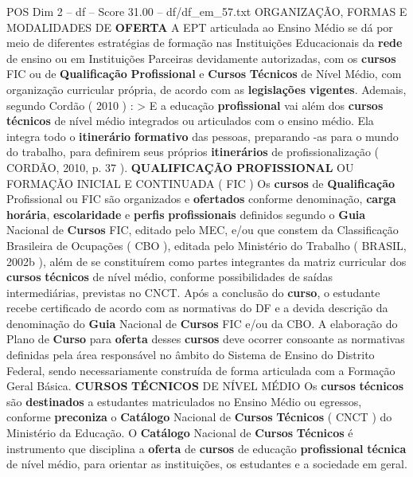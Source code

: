 \begin{textsample}{POS Dim 2 – df – Score 31.00 – df/df\_em\_57.txt}  \label{ex:f2_pos_121}
ORGANIZAÇÃO, FORMAS E MODALIDADES DE \textbf{OFERTA} A EPT articulada ao Ensino Médio se dá por meio de diferentes estratégias de formação nas Instituições Educacionais da \textbf{rede} de ensino ou em Instituições Parceiras devidamente autorizadas, com os \textbf{cursos} FIC ou de \textbf{Qualificação} \textbf{Profissional} e \textbf{Cursos} \textbf{Técnicos} de Nível Médio, com organização curricular própria, de acordo com as \textbf{legislações} \textbf{vigentes}.
Ademais, segundo Cordão ( 2010 ) : > E a educação \textbf{profissional} vai além dos \textbf{cursos} \textbf{técnicos} de nível médio integrados ou articulados com o ensino médio.
Ela integra todo o \textbf{itinerário} \textbf{formativo} das pessoas, preparando -as para o mundo do trabalho, para definirem seus próprios \textbf{itinerários} de profissionalização ( CORDÃO, 2010, p. 37 ). \textbf{QUALIFICAÇÃO} \textbf{PROFISSIONAL} OU FORMAÇÃO INICIAL E CONTINUADA ( FIC ) Os \textbf{cursos} de \textbf{Qualificação} Profissional ou FIC são organizados e \textbf{ofertados} conforme denominação, \textbf{carga} \textbf{horária}, \textbf{escolaridade} e \textbf{perfis} \textbf{profissionais} definidos segundo o \textbf{Guia} Nacional de \textbf{Cursos} FIC, editado pelo MEC, e/ou que constem da Classificação Brasileira de Ocupações ( CBO ), editada pelo Ministério do Trabalho ( BRASIL, 2002b ), além de se constituírem como partes integrantes da matriz curricular dos \textbf{cursos} \textbf{técnicos} de nível médio, conforme possibilidades de saídas intermediárias, previstas no CNCT.
Após a conclusão do \textbf{curso}, o estudante recebe certificado de acordo com as normativas do DF e a devida descrição da denominação do \textbf{Guia} Nacional de \textbf{Cursos} FIC e/ou da CBO.
A elaboração do Plano de \textbf{Curso} para \textbf{oferta} desses \textbf{cursos} deve ocorrer consoante as normativas definidas pela área responsável no âmbito do Sistema de Ensino do Distrito Federal, sendo necessariamente construída de forma articulada com a Formação Geral Básica. \textbf{CURSOS} \textbf{TÉCNICOS} DE NÍVEL MÉDIO Os \textbf{cursos} \textbf{técnicos} são \textbf{destinados} a estudantes matriculados no Ensino Médio ou egressos, conforme \textbf{preconiza} o \textbf{Catálogo} Nacional de \textbf{Cursos} \textbf{Técnicos} ( CNCT ) do Ministério da Educação.
O \textbf{Catálogo} Nacional de \textbf{Cursos} \textbf{Técnicos} é instrumento que disciplina a \textbf{oferta} de \textbf{cursos} de educação \textbf{profissional} \textbf{técnica} de nível médio, para orientar as instituições, os estudantes e a sociedade em geral.

\end{textsample}
